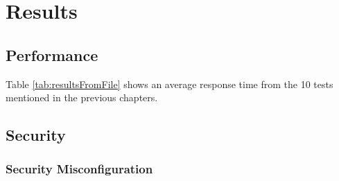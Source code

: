 
\chapter{Results}\label{cha:results}

\section{Performance}

Table \ref{tab:resultsFromFile} shows an average response time from the 10 tests mentioned in the previous chapters.



\section{Security}

\subsection{Security Misconfiguration}
